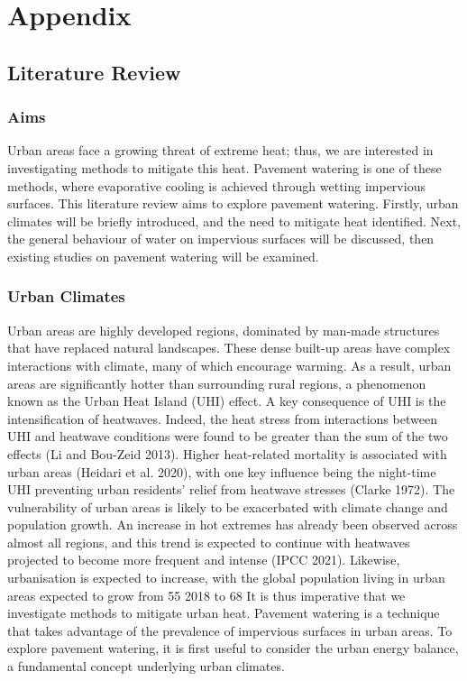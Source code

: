 \documentclass[final,3p,times,authoryear]{elsarticle}
\begin{document}
\appendix
\setcounter{table}{0}
\renewcommand{\thetable}{A\arabic{table}}

\section{Appendix}\label{sec:appendix7}
\subsection{Literature Review}\label{sec:appendix7.1}
\subsubsection{Aims}\label{sec:appendix7.1.1}
Urban areas face a growing threat of extreme heat; thus, we are interested in
investigating methods to mitigate this heat. Pavement watering is one of these methods,
where evaporative cooling is achieved through wetting impervious surfaces. This
literature review aims to explore pavement watering. Firstly, urban climates will be
briefly introduced, and the need to mitigate heat identified. Next, the general behaviour
of water on impervious surfaces will be discussed, then existing studies on pavement
watering will be examined.

\subsubsection{Urban Climates}\label{sec:appendix7.1.2}
Urban areas are highly developed regions, dominated by man-made structures that have
replaced natural landscapes. These dense built-up areas have complex interactions with
climate, many of which encourage warming. As a result, urban areas are significantly
hotter than surrounding rural regions, a phenomenon known as the Urban Heat Island
(UHI) effect.
A key consequence of UHI is the intensification of heatwaves. Indeed, the heat stress
from interactions between UHI and heatwave conditions were found to be greater than the sum of the two effects (Li and Bou-Zeid 2013). Higher heat-related mortality is
associated with urban areas (Heidari et al. 2020), with one key influence being the
night-time UHI preventing urban residents' relief from heatwave stresses (Clarke 1972).
The vulnerability of urban areas is likely to be exacerbated with climate change and
population growth. An increase in hot extremes has already been observed across
almost all regions, and this trend is expected to continue with heatwaves projected to
become more frequent and intense (IPCC 2021). Likewise, urbanisation is expected to
increase, with the global population living in urban areas expected to grow from 55 %
2018 to 68 %
It is thus imperative that we investigate methods to mitigate urban heat. Pavement
watering is a technique that takes advantage of the prevalence of impervious surfaces in
urban areas. To explore pavement watering, it is first useful to consider the urban
energy balance, a fundamental concept underlying urban climates.
\end{document}
